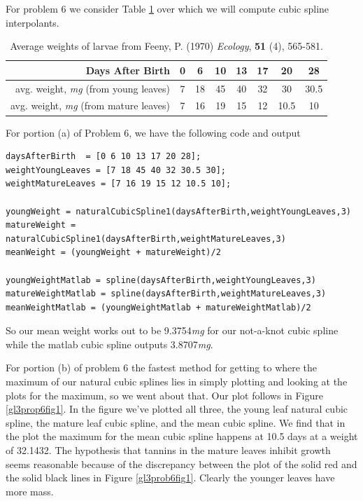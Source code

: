\documentclass[12pt]{amsart}
\begin{document}
\begin{onehalfspace}
        For problem 6 we consider Table \ref{larvaeWeight} over which we will compute cubic spline interpolants.
        \begin{table}
        \begin{tabular}{r|ccccccc}
            \hline
            Days After Birth & 0 & 6 & 10 & 13 & 17 & 20 & 28 \\
            \hline
            avg. weight, \emph{mg} (from young leaves) & 7 & 18 & 45 & 40 & 32 & 30 & 30.5\\
            avg. weight, \emph{mg} (from mature leaves) & 7 & 16 & 19 & 15 & 12 & 10.5 & 10\\
            \hline
        \end{tabular}
        \caption{Average weights of larvae from Feeny, P. (1970) \emph{Ecology}, \textbf{51} (4), 565-581.}
        \label{larvaeWeight}
        \end{table}
        For portion (a) of Problem 6, we have the following code and output
        \begin{tiny}
        \begin{verbatim}
daysAfterBirth  = [0 6 10 13 17 20 28];
weightYoungLeaves = [7 18 45 40 32 30.5 30];
weightMatureLeaves = [7 16 19 15 12 10.5 10];

youngWeight = naturalCubicSpline1(daysAfterBirth,weightYoungLeaves,3)
matureWeight = naturalCubicSpline1(daysAfterBirth,weightMatureLeaves,3)
meanWeight = (youngWeight + matureWeight)/2

youngWeightMatlab = spline(daysAfterBirth,weightYoungLeaves,3)
matureWeightMatlab = spline(daysAfterBirth,weightMatureLeaves,3)
meanWeightMatlab = (youngWeightMatlab + matureWeightMatlab)/2
        \end{verbatim}
        \end{tiny}
        So our mean weight works out to be 9.3754\emph{mg} for our not-a-knot cubic spline while the matlab cubic spline
        outputs 3.8707\emph{mg}.

        For portion (b) of problem 6 the fastest method for getting to where the maximum of our natural cubic splines
        lies in simply plotting and looking at the plots for the maximum, so we went about that. Our plot follows in
        Figure \ref{gl3prop6fig1}.
        In the figure we've plotted all three, the young leaf natural cubic spline, the mature leaf cubic spline, and the
        mean cubic spline.
        We find that in the plot the maximum for the mean cubic spline happens at 10.5 days at a weight of 32.1432.
        The hypothesis that tannins in the mature leaves inhibit growth seems reasonable because of the discrepancy
        between the plot of the solid red and the solid black lines in Figure \ref{gl3prob6fig1}.
        Clearly the younger leaves have more mass.



\end{onehalfspace}
\end{document}
